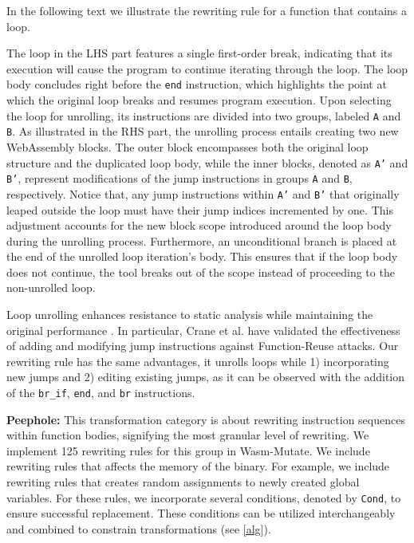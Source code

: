 \documentclass[a4paper,fleqn]{cas-dc}
\newcommand{\tool}{{\sc Wasm-Mutate}\xspace}
\begin{document}
In the following text we illustrate the rewriting rule for a function that contains a loop. 


The loop in the LHS part features a single first-order break, indicating that its execution will cause the program to continue iterating through the loop. 
The loop body concludes right before the \texttt{end} instruction, which highlights the point at which the original loop breaks and resumes program execution.
Upon selecting the loop for unrolling, its instructions are divided into two groups, labeled \texttt{A} and \texttt{B}. 
As illustrated in the RHS part, the unrolling process entails creating two new WebAssembly blocks. 
The outer block encompasses both the original loop structure and the duplicated loop body, while the inner blocks, denoted as \texttt{A'} and \texttt{B'}, represent modifications of the jump instructions in groups \texttt{A} and \texttt{B}, respectively.
Notice that, any jump instructions within \texttt{A'} and \texttt{B'} that originally leaped outside the loop must have their jump indices incremented by one. 
This adjustment accounts for the new block scope introduced around the loop body during the unrolling process. 
Furthermore, an unconditional branch is placed at the end of the unrolled loop iteration's body. 
This ensures that if the loop body does not continue, the tool breaks out of the scope instead of proceeding to the non-unrolled loop.


Loop unrolling enhances resistance to static analysis while maintaining the original performance \cite{10.1145/3453483.3454035}. 
In particular, Crane et al. \cite{10.1145/2810103.2813682} have validated the effectiveness of adding and modifying jump instructions against Function-Reuse attacks.
Our rewriting rule has the same advantages, it unrolls loops while 1) incorporating new jumps and 2) editing existing jumps, as it can be observed with the addition of the \texttt{br_if}, \texttt{end}, and \texttt{br} instructions. 



\textbf{Peephole:} 
This transformation category is about rewriting instruction sequences within function bodies, signifying the most granular level of rewriting. 
We implement 125 rewriting rules for this group in \tool. 
We include rewriting rules that affects the memory of the binary.
For example, we include rewriting rules that creates random assignments to newly created global variables.
For these rules, we incorporate several conditions, denoted by \texttt{Cond}, to ensure successful replacement. 
These conditions can be utilized interchangeably and combined to constrain transformations (see \autoref{alg}).
\end{document}
